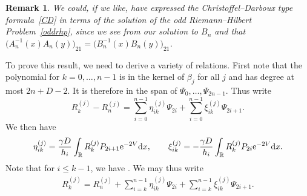 \documentclass[pdftex]{sigma}
\numberwithin{equation}{section}
\newtheorem{Remark}[Theorem]{Remark}
\begin{document}
\begin{Remark} We could, if we like, have expressed the Christoffel--Darboux type formula~\eqref{CD} in terms of the solution of the odd Riemann--Hilbert Problem~\ref{oddrhp}, since we see from our solution to $B_n$ and  that $\big( A_n^{-1}(x) A_n(y) \big)_{21} = \big( B_n^{-1}(x) B_n(y) \big)_{21}$.
\end{Remark}

To prove this result, we need to derive a variety of relations. First note that the polynomial  for $k=0, \dots, n-1$ is in the kernel of $\beta_j$ for all $j$ and has degree at most $2n+D-2$. It is therefore in the span of $\Psi_0 , \dots, \Psi_{2n-1}$. Thus write
\[
R_k^{(j)}- R_n^{(j)} = \sum_{i=0}^{n-1} \eta_{ik}^{(j)} \Psi_{2i}+\sum_{i=0}^{n-1} \xi_{ik}^{(j)} \Psi_{2i+1}.
\]
 We then have
\begin{align*}
\eta_{ik}^{(j)} = \frac{\gamma D}{h_i}\int_\mathbb{R} R_k^{(j)} P_{2i+1} {\rm e}^{-2V} {\rm d}x ,\qquad
\xi_{ik}^{(j)} = - \frac{\gamma D}{h_i} \int_\mathbb{R} R_k^{(j)} P_{2i} {\rm e}^{-2V} {\rm d}x.
\end{align*}
Note that for $i \leq k-1$, we have . We may thus write
\begin{align*}
R_k^{(j)} = R_n^{(j)}+ \sum_{i=k}^{n-1} \eta_{ik}^{(j)} \Psi_{2i}+\sum_{i=k}^{n-1} \xi_{ik}^{(j)} \Psi_{2i+1}.
\end{align*}
\end{document}
